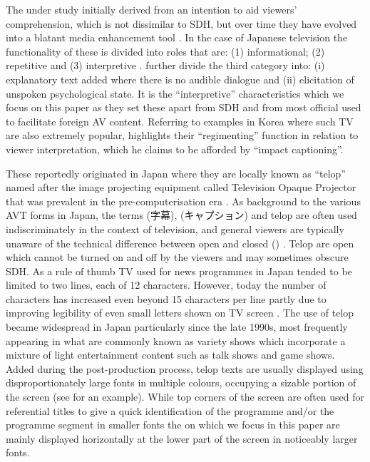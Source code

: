 \documentclass[output=paper]{langsci/langscibook}
\begin{document}
The  under study initially derived from an intention to aid viewers' comprehension, which is not dissimilar to SDH, but over time they have evolved into a blatant media enhancement tool \citep[48--50]{Kato2012}.  In the case of Japanese television the functionality of these  is divided into roles that are: (1) informational; (2) repetitive and (3) interpretive \citep[72]{Shiota2003}. \citet{Kimura2000} further divide the third category into: (i) explanatory text added where there is no audible dialogue and (ii) elicitation of unspoken psychological state. It is the ``interpretive'' characteristics which we focus on this paper as they set these  apart from SDH and from most official  used to facilitate foreign AV content. Referring to examples in Korea where such TV  are also extremely popular, \citet{Park2009} highlights their ``regimenting'' function in relation to viewer interpretation, which he claims to be afforded by ``impact captioning''. 

These  reportedly originated in Japan where they are locally known as ``telop'' named after the image projecting equipment called Television Opaque Projector that was prevalent in the pre-computerisation era \citep{Sakamoto1999}. As background to the various AVT forms in Japan, the terms  
({字幕}),
({キャプション}) 
and telop are often used indiscriminately in the context of television, and general viewers are typically unaware of the technical difference between open and closed  () \citep[73--74]{ohagan2010}. Telop are open  which cannot be turned on and off by the viewers and may sometimes obscure SDH.  As a rule of thumb TV  used for news programmes in Japan tended to be limited to two lines, each of 12 characters. However, today the number of characters has increased even beyond 15 characters per line partly due to improving legibility of even small letters shown on TV screen \citep[47--48]{Kato2012}. The use of telop became widespread in Japan particularly since the late 1990s, most frequently appearing in what are commonly known as variety shows \citep{Shitara2012} which incorporate a mixture of light entertainment content such as talk shows and game shows. Added during the post-production process, telop texts are usually displayed using disproportionately large fonts in multiple colours, occupying a sizable portion of the screen (see  for an example).  While top corners of the screen are often used for referential titles to give a quick identification of the programme and/or the programme segment in smaller fonts the  on which we focus in this paper are mainly displayed horizontally at the lower part of the screen in noticeably larger fonts. 
\end{document}
